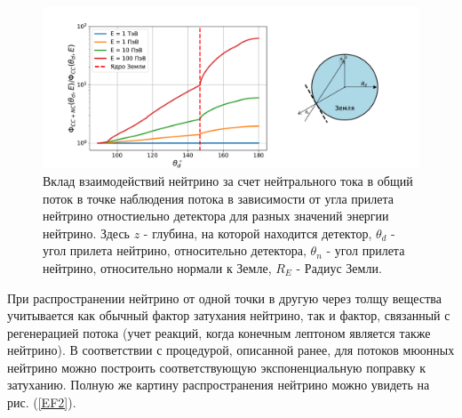 \begin{figure}[!h]
\centering
\includegraphics[width=1.1\linewidth]{images/NuProp/rhh12zf_flux_index_CT18ZNNLO.pdf}
\caption{Вклад взаимодействий нейтрино за счет нейтрального тока в общий поток в точке наблюдения потока в зависимости от угла прилета нейтрино отностиельно детектора для разных значений энергии нейтрино. Здесь $z$ - глубина, на которой находится детектор, $\theta_d$ - угол прилета нейтрино, относительно детектора, $\theta_n$ - угол прилета нейтрино, относительно нормали к Земле, $R_E$ - Радиус Земли.}
\label{EF1}
\end{figure}
При распространении нейтрино от одной точки в другую через толщу вещества учитывается как обычный фактор затухания нейтрино, так и фактор, связанный с регенерацией потока (учет реакций, когда конечным лептоном является также нейтрино). В соответствии с процедурой, описанной ранее, для потоков мюонных нейтрино можно построить соответствующую экспоненциальную поправку к затуханию. Полную же картину распространения нейтрино можно увидеть на рис. (\ref{EF2}).


